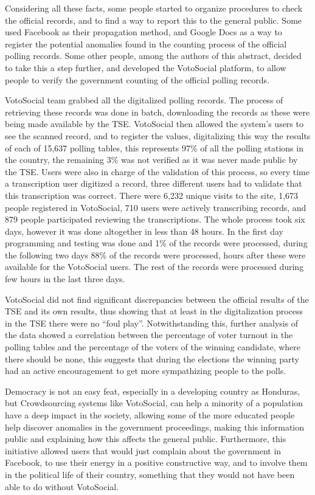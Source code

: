 \documentclass[a4paper,10pt]{article}
\begin{document}
Considering all these facts, some people started to organize procedures to check the official records, and to find a way to report this to the general public. Some used Facebook as their propagation method, and Google Docs as a way to register the potential anomalies found in the counting process of the official polling records. Some other people, among the authors of this abstract, decided to take this a step further, and developed the VotoSocial platform, to allow people to verify the government counting of the official polling records.

VotoSocial team grabbed all the digitalized polling records. The process of retrieving these records was done in batch, downloading the records as these were being made available by the TSE. VotoSocial then allowed the system's users to see the scanned record, and to register the values, digitalizing this way the results of each of 15,637 polling tables, this represents 97\% of all the polling stations in the country, the remaining 3\% was not verified as it was never made public by the TSE. Users were also in charge of the validation of this process, so every time a transcription user digitized a record, three different users had to validate that this transcription was correct. There were 6,232 unique visits to the site, 1,673 people registered in VotoSocial, 710 users were actively transcribing records, and 879 people participated reviewing the transcriptions. The whole process took six days, however it was done altogether in less than 48 hours. In the first day programming and testing was done and 1\% of the records were processed, during the following two days 88\% of the records were processed, hours after these were available for the VotoSocial users. The rest of the records were processed during few hours in the last three days.

VotoSocial did not find significant discrepancies between the official results of the TSE and its own results, thus showing that at least in the digitalization process in the TSE there were no “foul play”. Notwithstanding this, further analysis of the data showed a correlation between the percentage of voter turnout in the polling tables and the percentage of the voters of the winning candidate, where there should be none, this suggests that during the elections the winning party had an active encouragement to get more sympathizing people to the polls.

Democracy is not an easy feat, especially in a developing country as Honduras, but Crowdsourcing systems like VotoSocial, can help a minority of a population have a deep impact in the society, allowing some of the more educated people help discover anomalies in the government proceedings, making this information public and explaining how this affects the general public. Furthermore, this initiative allowed users that would just complain about the government in Facebook, to use their energy in a positive constructive way, and to involve them in the political life of their country, something that they would not have been able to do without VotoSocial.
\end{document}
